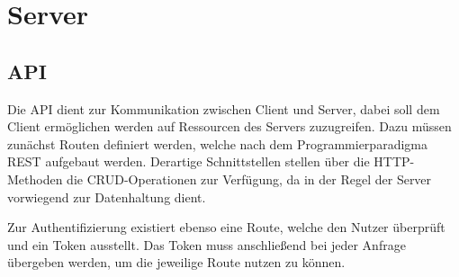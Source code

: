 \section{Server}


\subsection{\acl{API}}
Die \acf{API} dient zur Kommunikation zwischen Client und Server, dabei soll dem Client ermöglichen werden auf Ressourcen des Servers zuzugreifen.
Dazu müssen zunächst Routen definiert werden, welche nach dem Programmierparadigma \ac{REST} aufgebaut werden.
Derartige Schnittstellen stellen über die \ac{HTTP}-Methoden die \ac{CRUD}-Operationen zur Verfügung, da in der Regel der Server vorwiegend zur Datenhaltung dient.



Zur Authentifizierung existiert ebenso eine Route, welche den Nutzer überprüft und ein Token ausstellt.
Das Token muss anschließend bei jeder Anfrage übergeben werden, um die jeweilige Route nutzen zu können.

